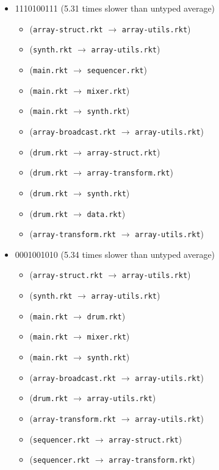 \documentclass{article}
\newcommand{\mono}[1]{\texttt{#1}}
\begin{document}
\begin{itemize}
\begin{itemize}
  \end{itemize}
\item 1110100111 (5.31 times slower than untyped average)
  \begin{itemize}
  \item (\mono{array-struct.rkt} $\rightarrow$ \mono{array-utils.rkt})
  \item (\mono{synth.rkt} $\rightarrow$ \mono{array-utils.rkt})
  \item (\mono{main.rkt} $\rightarrow$ \mono{sequencer.rkt})
  \item (\mono{main.rkt} $\rightarrow$ \mono{mixer.rkt})
  \item (\mono{main.rkt} $\rightarrow$ \mono{synth.rkt})
  \item (\mono{array-broadcast.rkt} $\rightarrow$ \mono{array-utils.rkt})
  \item (\mono{drum.rkt} $\rightarrow$ \mono{array-struct.rkt})
  \item (\mono{drum.rkt} $\rightarrow$ \mono{array-transform.rkt})
  \item (\mono{drum.rkt} $\rightarrow$ \mono{synth.rkt})
  \item (\mono{drum.rkt} $\rightarrow$ \mono{data.rkt})
  \item (\mono{array-transform.rkt} $\rightarrow$ \mono{array-utils.rkt})
  \end{itemize}
\item 0001001010 (5.34 times slower than untyped average)
  \begin{itemize}
  \item (\mono{array-struct.rkt} $\rightarrow$ \mono{array-utils.rkt})
  \item (\mono{synth.rkt} $\rightarrow$ \mono{array-utils.rkt})
  \item (\mono{main.rkt} $\rightarrow$ \mono{drum.rkt})
  \item (\mono{main.rkt} $\rightarrow$ \mono{mixer.rkt})
  \item (\mono{main.rkt} $\rightarrow$ \mono{synth.rkt})
  \item (\mono{array-broadcast.rkt} $\rightarrow$ \mono{array-utils.rkt})
  \item (\mono{drum.rkt} $\rightarrow$ \mono{array-utils.rkt})
  \item (\mono{array-transform.rkt} $\rightarrow$ \mono{array-utils.rkt})
  \item (\mono{sequencer.rkt} $\rightarrow$ \mono{array-struct.rkt})
  \item (\mono{sequencer.rkt} $\rightarrow$ \mono{array-transform.rkt})

\end{itemize}
\end{itemize}
\end{document}
